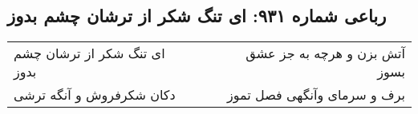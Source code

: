 \begin{center}
\section*{رباعی شماره ۹۳۱: ای تنگ شکر از ترشان چشم بدوز}
\label{sec:0931}
\begin{longtable}{l p{0.5cm} r}
ای تنگ شکر از ترشان چشم بدوز
&&
آتش بزن و هرچه به جز عشق بسوز
\\
دکان شکرفروش و آنگه ترشی
&&
برف و سرمای وآنگهی فصل تموز
\\
\end{longtable}
\end{center}
